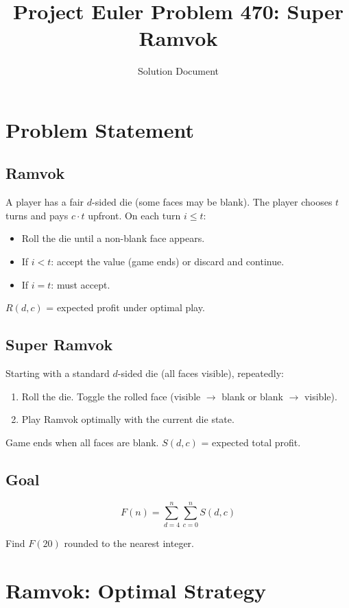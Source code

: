 \documentclass[11pt]{article}
\title{Project Euler Problem 470: Super Ramvok}
\author{Solution Document}
\date{}
\begin{document}
\maketitle

\section{Problem Statement}

\subsection{Ramvok}

A player has a fair $d$-sided die (some faces may be blank). The player chooses $t$ turns and pays $c \cdot t$ upfront. On each turn $i \leq t$:
\begin{itemize}
\item Roll the die until a non-blank face appears.
\item If $i < t$: accept the value (game ends) or discard and continue.
\item If $i = t$: must accept.
\end{itemize}

$R(d, c)$ = expected profit under optimal play.

\subsection{Super Ramvok}

Starting with a standard $d$-sided die (all faces visible), repeatedly:
\begin{enumerate}
\item Roll the die. Toggle the rolled face (visible $\to$ blank or blank $\to$ visible).
\item Play Ramvok optimally with the current die state.
\end{enumerate}

Game ends when all faces are blank. $S(d, c)$ = expected total profit.

\subsection{Goal}

\[
F(n) = \sum_{d=4}^{n} \sum_{c=0}^{n} S(d, c)
\]

Find $F(20)$ rounded to the nearest integer.

\section{Ramvok: Optimal Strategy}
\end{document}
